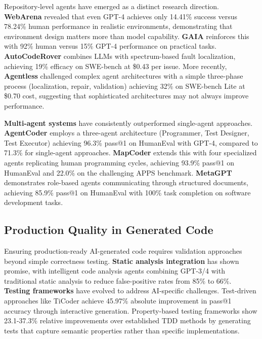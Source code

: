 \documentclass{article}
\begin{document}
Repository-level agents have emerged as a distinct research direction. \textbf{WebArena} \citep{zhou2024webarena} revealed that even GPT-4 achieves only 14.41\% success versus 78.24\% human performance in realistic environments, demonstrating that environment design matters more than model capability. \textbf{GAIA} \citep{mialon2023gaia} reinforces this with 92\% human versus 15\% GPT-4 performance on practical tasks. \textbf{AutoCodeRover} \citep{zhang2024autocoder} combines LLMs with spectrum-based fault localization, achieving 19\% efficacy on SWE-bench at \$0.43 per issue. More recently, \textbf{Agentless} \citep{xia2024agentless} challenged complex agent architectures with a simple three-phase process (localization, repair, validation) achieving 32\% on SWE-bench Lite at \$0.70 cost, suggesting that sophisticated architectures may not always improve performance.

\textbf{Multi-agent systems} have consistently outperformed single-agent approaches. \textbf{AgentCoder} \citep{huang2023agentcoder} employs a three-agent architecture (Programmer, Test Designer, Test Executor) achieving 96.3\% pass@1 on HumanEval with GPT-4, compared to 71.3\% for single-agent approaches. \textbf{MapCoder} \citep{islam2024mapcoder} extends this with four specialized agents replicating human programming cycles, achieving 93.9\% pass@1 on HumanEval and 22.0\% on the challenging APPS benchmark. \textbf{MetaGPT} \citep{hong2023metagpt} demonstrates role-based agents communicating through structured documents, achieving 85.9\% pass@1 on HumanEval with 100\% task completion on software development tasks.

\subsection{Production Quality in Generated Code}

Ensuring production-ready AI-generated code requires validation approaches beyond simple correctness testing. \textbf{Static analysis integration} has shown promise, with intelligent code analysis agents combining GPT-3/4 with traditional static analysis to reduce false-positive rates from 85\% to 66\%. \textbf{Testing frameworks} have evolved to address AI-specific challenges. Test-driven approaches like TiCoder achieve 45.97\% absolute improvement in pass@1 accuracy through interactive generation. Property-based testing frameworks show 23.1-37.3\% relative improvements over established TDD methods by generating tests that capture semantic properties rather than specific implementations.
\end{document}
